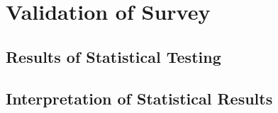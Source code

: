 \section{Validation of Survey}
\label{sec:validation_survey}



\subsection{Results of Statistical Testing}

\subsection{Interpretation of Statistical Results}
